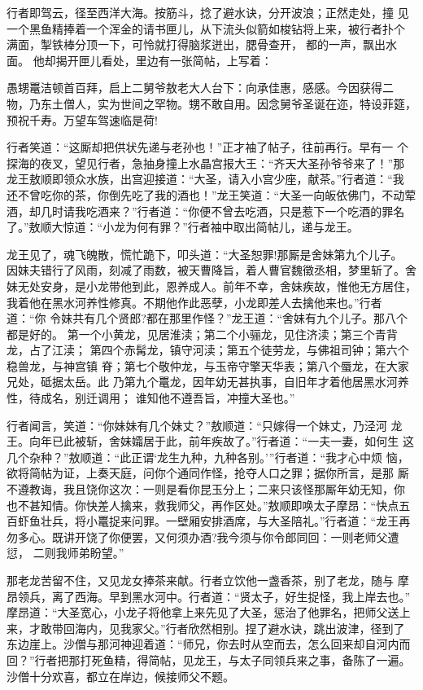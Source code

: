 行者即驾云，径至西洋大海。按筋斗，捻了避水诀，分开波浪；正然走处，撞
见一个黑鱼精捧着一个浑金的请书匣儿，从下流头似箭如梭钻将上来，被行者扑个
满面，掣铁棒分顶一下，可怜就打得脑浆迸出，腮骨查开，都的一声，飘出水面。
他却揭开匣儿看处，里边有一张简帖，上写着：

愚甥鼍洁顿首百拜，启上二舅爷敖老大人台下：向承佳惠，感感。今因获得二
物，乃东土僧人，实为世间之罕物。甥不敢自用。因念舅爷圣诞在迩，特设菲筵，
预祝千寿。万望车驾速临是荷!

行者笑道：“这厮却把供状先递与老孙也！”正才袖了帖子，往前再行。早有一
个探海的夜叉，望见行者，急抽身撞上水晶宫报大王：“齐天大圣孙爷爷来了！”那
龙王敖顺即领众水族，出宫迎接道：“大圣，请入小宫少座，献茶。”行者道：“我
还不曾吃你的茶，你倒先吃了我的酒也！”龙王笑道：“大圣一向皈依佛门，不动荤
酒，却几时请我吃酒来？”行者道：“你便不曾去吃酒，只是惹下一个吃酒的罪名
了。”敖顺大惊道：“小龙为何有罪？”行者袖中取出简帖儿，递与龙王。

龙王见了，魂飞魄散，慌忙跪下，叩头道：“大圣恕罪!那厮是舍妹第九个儿子。
因妹夫错行了风雨，刻减了雨数，被天曹降旨，着人曹官魏徵丞相，梦里斩了。舍
妹无处安身，是小龙带他到此，恩养成人。前年不幸，舍妹疾故，惟他无方居住，
我着他在黑水河养性修真。不期他作此恶孽，小龙即差人去擒他来也。”行者道：“你
令妹共有几个贤郎?都在那里作怪？”龙王道：“舍妹有九个儿子。那八个都是好的。
第一个小黄龙，见居淮渎；第二个小骊龙，见住济渎；第三个青背龙，占了江渎；
第四个赤髯龙，镇守河渎；第五个徒劳龙，与佛祖司钟；第六个稳兽龙，与神宫镇
脊；第七个敬仲龙，与玉帝守擎天华表；第八个蜃龙，在大家兄处，砥据太岳。此
乃第九个鼍龙，因年幼无甚执事，自旧年才着他居黑水河养性，待成名，别迁调用；
谁知他不遵吾旨，冲撞大圣也。”

行者闻言，笑道：“你妹妹有几个妹丈？”敖顺道：“只嫁得一个妹丈，乃泾河
龙王。向年已此被斩，舍妹孀居于此，前年疾故了。”行者道：“一夫一妻，如何生
这几个杂种？”敖顺道：“此正谓‘龙生九种，九种各别。’”行者道：“我才心中烦
恼，欲将简帖为证，上奏天庭，问你个通同作怪，抢夺人口之罪；据你所言，是那
厮不遵教诲，我且饶你这次：一则是看你昆玉分上；二来只该怪那厮年幼无知，你
也不甚知情。你快差人擒来，救我师父，再作区处。”敖顺即唤太子摩昂：“快点五
百虾鱼壮兵，将小鼍捉来问罪。一壁厢安排酒席，与大圣陪礼。”行者道：“龙王再
勿多心。既讲开饶了你便罢，又何须办酒?我今须与你令郎同回：一则老师父遭愆，
二则我师弟盼望。”

那老龙苦留不住，又见龙女捧茶来献。行者立饮他一盏香茶，别了老龙，随与
摩昂领兵，离了西海。早到黑水河中。行者道：“贤太子，好生捉怪，我上岸去也。”
摩昂道：“大圣宽心，小龙子将他拿上来先见了大圣，惩治了他罪名，把师父送上
来，才敢带回海内，见我家父。”行者欣然相别。捏了避水诀，跳出波津，径到了
东边崖上。沙僧与那河神迎着道：“师兄，你去时从空而去，怎么回来却自河内而
回？”行者把那打死鱼精，得简帖，见龙王，与太子同领兵来之事，备陈了一遍。
沙僧十分欢喜，都立在岸边，候接师父不题。

